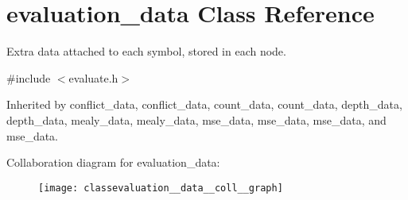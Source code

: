 \hypertarget{classevaluation__data}{}\section{evaluation\+\_\+data Class Reference}
\label{classevaluation__data}


Extra data attached to each symbol, stored in each node.  




{\ttfamily \#include $<$evaluate.\+h$>$}



Inherited by conflict\+\_\+data, conflict\+\_\+data, count\+\_\+data, count\+\_\+data, depth\+\_\+data, depth\+\_\+data, mealy\+\_\+data, mealy\+\_\+data, mse\+\_\+data, mse\+\_\+data, mse\+\_\+data, and mse\+\_\+data.



Collaboration diagram for evaluation\+\_\+data\+:
\nopagebreak
\begin{figure}[H]
\begin{center}
\leavevmode
\texttt{[image: classevaluation\_\_data\_\_coll\_\_graph]}
\end{center}
\end{figure}
